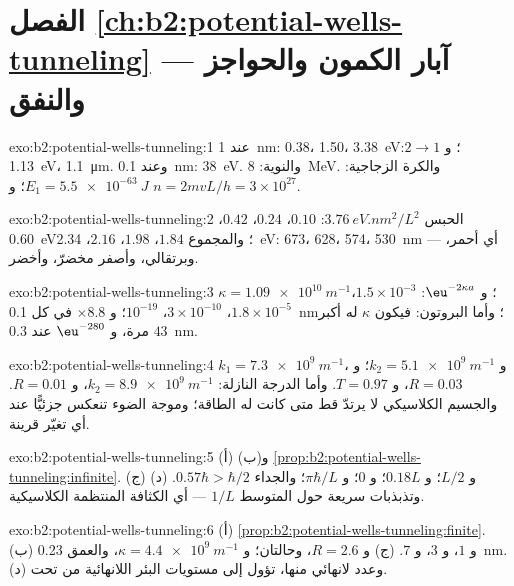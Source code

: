 \section*{الفصل \ref{ch:b2:potential-wells-tunneling} --- آبار الكمون والحواجز والنفق}

\begin{solution}{exo:b2:potential-wells-tunneling:1}
عند \qty{1}{nm}: \qty{0.38}{}، \qty{1.50}{}، \qty{3.38}{eV}؛ و $2 \to 1$: \qty{1.13}{eV}، \qty{1.1}{\micro m}.
وعند \qty{0.1}{nm}: \qty{38}{eV}. والنوية: \qty{8}{MeV}. والكرة الزجاجية: $E_1 = \qty{5.5e-63}{J}$؛
و $n = 2mvL/h = 3 \times 10^{27}$.
\end{solution}

\begin{solution}{exo:b2:potential-wells-tunneling:2}
الحبس $\qty{3.76}{eV.nm^2}/L^2$: $0.10$، $0.24$، $0.42$، \qty{0.60}{eV}؛ والمجموع
$1.84$، $1.98$، $2.16$، \qty{2.34}{eV}: \qty{673}{}، \qty{628}{}، \qty{574}{}، \qty{530}{nm} ---
أي أحمر، وبرتقالي، وأصفر مخضرّ، وأخضر.
\end{solution}

\begin{solution}{exo:b2:potential-wells-tunneling:3}
$\kappa = \qty{1.09e10}{m^{-1}}$؛ و $\eu^{-2\kappa a}$: $1.5 \times 10^{-3}$، $1.8 \times 10^{-5}$،
$3 \times 10^{-10}$، $10^{-19}$؛ و $\times 8.8$ في كل \qty{0.1}{nm}؛ وأما البروتون: فيكون $\kappa$ له
أكبر $43$ مرة، و $\eu^{-280}$ عند \qty{0.3}{nm}.
\end{solution}

\begin{solution}{exo:b2:potential-wells-tunneling:4}
$k_1 = \qty{7.3e9}{m^{-1}}$، و $k_2 = \qty{5.1e9}{m^{-1}}$؛ و $R = 0.03$، و $T = 0.97$. وأما الدرجة
النازلة: $k_2 = \qty{8.9e9}{m^{-1}}$، و $R = 0.01$. والجسيم الكلاسيكي لا
يرتدّ قط متى كانت له الطاقة؛ وموجة الضوء تنعكس جزئيًّا
عند أي تغيّر قرينة.
\end{solution}

\begin{solution}{exo:b2:potential-wells-tunneling:5}
(أ) و(ب) \cref{prop:b2:potential-wells-tunneling:infinite}. (ج) و $L/2$؛
و $0.18L$؛ و $0$؛ و $\pi\hbar/L$؛ والجداء $0.57\hbar > \hbar/2$. (د) وتذبذبات
سريعة حول المتوسط $1/L$ --- أي الكثافة المنتظمة الكلاسيكية.
\end{solution}

\begin{solution}{exo:b2:potential-wells-tunneling:6}
(أ) \cref{prop:b2:potential-wells-tunneling:finite}. (ب) و $1$، و $3$، و $7$.
(ج) و $R = 2.6$، وحالتان؛ و $\kappa = \qty{4.4e9}{m^{-1}}$، والعمق \qty{0.23}{nm}. (د)
وعدد لانهائي منها، تؤول إلى مستويات البئر اللانهائية من تحت.
\end{solution}

